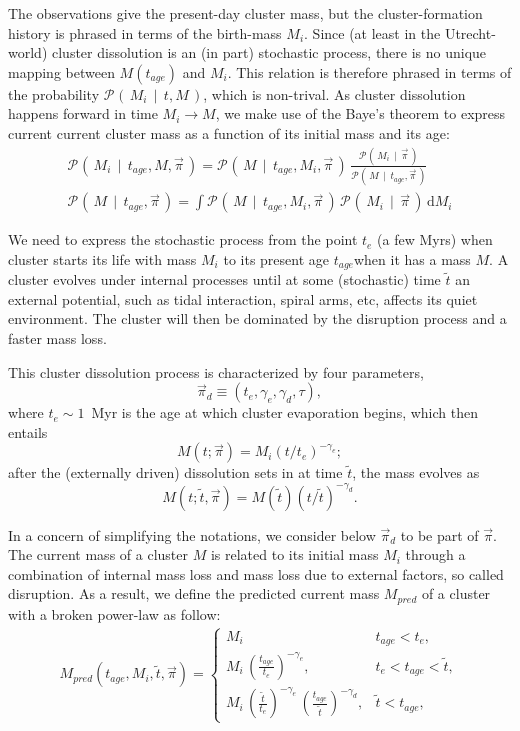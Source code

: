 \documentclass[a4paper]{article}
\newcommand{\given}{\ensuremath{\,\mid\,}}
\newcommand{\proba}[2][]{\ensuremath{\mathcal{P}_{#1}\left(\, #2 \,\right)}}
\newcommand{\tage}{\ensuremath{t_{age}}}
\newcommand{\Mi}{\ensuremath{M_{i}}}
\newcommand{\ts}{\ensuremath{\tilde{t}}} %
\newcommand{\PI}{\ensuremath{\overrightarrow{\pi}}} %
\newcommand{\dif}{\ensuremath{\text{d}}} %
\begin{document}
The observations give the present-day cluster mass, but the cluster-formation history is phrased in terms of the birth-mass $\Mi$. Since (at least in the Utrecht-world) cluster dissolution is an (in part)  stochastic process, there is no unique mapping between $M(\tage)$ and $\Mi$. This relation is therefore phrased in terms of the probability $\proba{\Mi \given t, M}$, which is non-trival. As cluster dissolution happens forward in time $\Mi \rightarrow M$, we make use of the Baye's theorem to express current current cluster mass as a function of its initial mass and its age:
\begin{eqnarray}
\proba{\Mi \given \tage, M, \PI} = \proba{M \given \tage, \Mi, \PI}\, \frac{\proba{\Mi\given\PI}}{\proba{M \given \tage, \PI}} \\
\proba{M\given \tage, \PI} = \int \proba{M\given \tage, \Mi, \PI }\, \proba{\Mi\given\PI }\, \dif\Mi
\end{eqnarray}

We need to express the stochastic process from the point $t_e$ (a few Myrs) when cluster starts its life with mass $\Mi$ to its present age \tage when it has a mass $M$.
A cluster evolves under internal processes until at some (stochastic) time $\ts$ an external potential, such as tidal interaction, spiral arms, etc, affects its quiet environment. The cluster will then be dominated by the disruption process and a faster mass loss.

This cluster dissolution process is characterized by four parameters, 
\begin{equation}
\PI_d \equiv (t_e,\gamma_e,\gamma_d,\tau),
\end{equation}
where $t_e\sim 1$~Myr is the age at which cluster evaporation begins, which then entails 
\begin{equation}
M(t; \PI)=M_i (t/t_e)^{-\gamma_e};
\end{equation}
after the (externally driven) dissolution sets in at time $\ts$, the mass evolves as 
\begin{equation}
M(t;\ts, \PI)=M(\ts )(t/\ts)^{-\gamma_d}.
\end{equation}

In a concern of simplifying the notations, we consider below $\PI_d$ to be part of $\PI$.
The current mass of a cluster $M$ is related to its initial mass $\Mi$ through a combination of internal mass loss and mass loss due to external factors, so called disruption.
As a result, we define the predicted current mass $M_{pred}$ of a cluster with a broken power-law as follow:
\begin{eqnarray}
M_{pred}(\tage, \Mi, \ts, \PI) = 
   \begin{cases}
   \Mi & \tage < t_e, \\
   \Mi \, \left(\frac{\tage}{t_e}\right)^{-\gamma_e}, & t_e < \tage < \ts, \\
   \Mi \, \left(\frac{\ts}{t_e}\right)^{-\gamma_e}\,\left(\frac{\tage}{\ts}\right)^{-\gamma_d}, & \ts < \tage,
   \end{cases}
\end{eqnarray}
\end{document}
